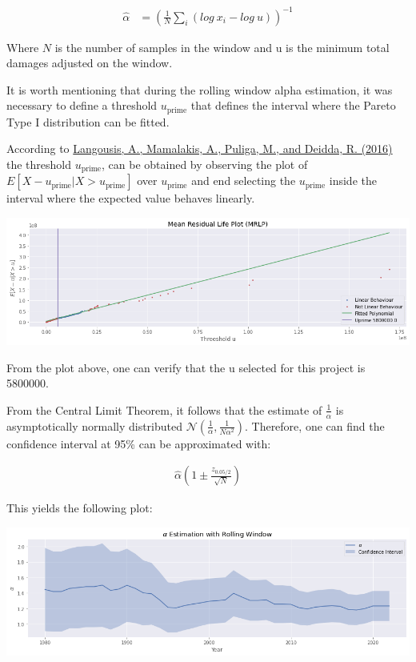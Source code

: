 \documentclass[paper=a4, fontsize=11pt]{scrartcl} %
\begin{document}
\begin{align*}
    \hat{\alpha} & = \left( \frac{1}{N} \sum_{i} (log \ x_i - log \ u) \right)^{-1}
\end{align*}  

Where $N$ is the number of samples in the window and u is the minimum total damages adjusted on the window.

It is worth mentioning that during the rolling window alpha estimation, it was necessary to define a threshold $u_{\text{prime}}$ that defines the interval where the Pareto Type I distribution can be fitted.

According to \href{https://agupubs.onlinelibrary.wiley.com/doi/epdf/10.1002/2015WR018502}{Langousis, A., Mamalakis, A., Puliga, M., and Deidda, R. (2016)} the threshold $u_{\text{prime}}$, can be obtained by observing the plot of $E[X - u_{\text{prime}} | X > u_{\text{prime}}]$ over $u_{\text{prime}}$ and end selecting the $u_{\text{prime}}$ inside the interval where the expected value behaves linearly.

\begin{center}
    \includegraphics[scale=0.5]{imgs/mrlp.png}
\end{center}

From the plot above, one can verify that the u selected for this project is 5800000.

From the Central Limit Theorem, it follows that the estimate of $\frac{1}{\alpha}$ is asymptotically normally distributed $\mathcal{N} \left(\frac{1}{\alpha}, \frac{1}{N \alpha^2} \right)$. Therefore, one can find the confidence interval at 95\% can be approximated with:

\begin{align*}
    \hat{\alpha} \left( 1 \pm \frac{z_{0.05/2}}{\sqrt{N}} \right)
\end{align*} 

This yields the following plot:

\begin{center}
    \includegraphics[scale=0.5]{imgs/alpha_estimation_with_rolling_window.png}
\end{center}
\end{document}
